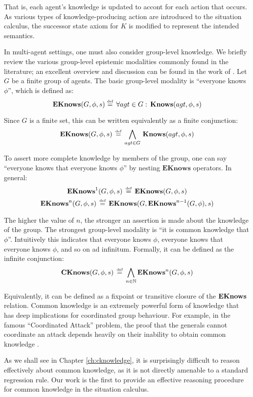 That is, each agent's knowledge is updated to accont for each action
that occurs. As various types of knowledge-producing action are introduced
to the situation calculus, the successor state axiom for $K$ is modified
to represent the intended semantics.

In multi-agent settings, one must also consider group-level knowledge.
We briefly review the various group-level epistemic modalities commonly
found in the literature; an excellent overview and discussion can
be found in the work of \citet{halpern90knowledge_distrib}. Let $G$
be a finite group of agents. The basic group-level modality is {}``everyone
knows $\phi$'', which is defined as:\[
\mathbf{EKnows}(G,\phi,s)\stackrel{\mbox{\tiny def}}{=}\,\forall agt\in G:\,\mathbf{Knows}(agt,\phi,s)\]


Since $G$ is a finite set, this can be written equivalently as a
finite conjunction:\[
\mathbf{EKnows}(G,\phi,s)\,\stackrel{\mbox{\tiny def}}{=}\,\bigwedge_{agt\in G}\,\mathbf{Knows}(agt,\phi,s)\]


To assert more complete knowledge by members of the group, one can
say {}``everyone knows that everyone knows $\phi$'' by nesting
$\mathbf{EKnows}$ operators. In general:\begin{gather*}
\mathbf{EKnows}^{1}(G,\phi,s)\,\stackrel{\mbox{\tiny def}}{=}\,\mathbf{EKnows}(G,\phi,s)\\
\mathbf{EKnows}^{n}(G,\phi,s)\,\stackrel{\mbox{\tiny def}}{=}\,\mathbf{EKnows}(G,\mathbf{EKnows}^{n-1}(G,\phi),s)\end{gather*}


The higher the value of $n$, the stronger an assertion is made about
the knowledge of the group. The strongest group-level modality is
{}``it is common knowledge that $\phi$''. Intuitively this indicates
that everyone knows $\phi$, everyone knows that everyone knows $\phi$,
and so on ad infinitum. Formally, it can be defined as the infinite
conjunction:\[
\mathbf{CKnows}(G,\phi,s)\,\stackrel{\mbox{\tiny def}}{=}\,\bigwedge_{n\in\mathbb{N}}\mathbf{EKnows}^{n}(G,\phi,s)\]


Equivalently, it can be defined as a fixpoint or transitive closure
of the $\mathbf{EKnows}$ relation. Common knowledge is an extremely powerful
form of knowledge that has deep implications for coordinated group
behaviour. For example, in the famous {}``Coordinated Attack'' problem,
the proof that the generals cannot coordinate an attack depends heavily
on their inability to obtain common knowledge \citep{halpern90knowledge_distrib}.

As we shall see in Chapter \ref{ch:cknowledge}, it is surprisingly
difficult to reason effectively about common knowledge, as it is not
directly amenable to a standard regression rule. Our work is the first
to provide an effective reasoning procedure for common knowledge in
the situation calculus.


